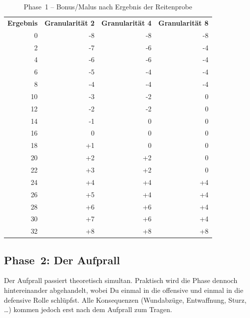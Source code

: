 \documentclass[12pt,div=calc,a5paper,parskip=half]{scrartcl}
\begin{document}
\begin{table}[h]
    \centering\small
\begin{tabular}{rrrr}
   \textbf{Ergebnis} & \textbf{Granularität 2} & \textbf{Granularität 4} & \textbf{Granularität 8}\\
   0 & -8 & -8 & -8\\
   2 & -7 & -6 & -4\\
   4 & -6 & -6 & -4\\
   6 & -5 & -4 & -4\\
   8 & -4 & -4 & -4\\
   10 & -3 & -2 & 0\\
   12 & -2 & -2 & 0\\
   14 & -1 & 0 & 0\\
   16 & 0 & 0 & 0\\
   18 & +1 & 0 & 0\\
   20 & +2 & +2 & 0\\
   22 & +3 & +2 & 0\\
   24 & +4 & +4 & +4\\
   26 & +5 & +4 & +4\\
   28 & +6 & +6 & +4\\
   30 & +7 & +6 & +4\\
   32 & +8 & +8 & +8\\
\end{tabular}
\caption{Phase~1 -- Bonus/Malus nach Ergebnis der Reitenprobe}
\label{tbl:ph1:bonus}
\end{table}

\subsection{Phase~2: Der Aufprall}

Der Aufprall passiert theoretisch simultan. Praktisch wird die Phase dennoch hintereinander abgehandelt, wobei Du einmal in die offensive und einmal in die defensive Rolle schlüpfst. Alle Konsequenzen (Wundabzüge, Entwaffnung, Sturz, \dots) kommen jedoch erst nach dem Aufprall zum Tragen. 
\end{document}
